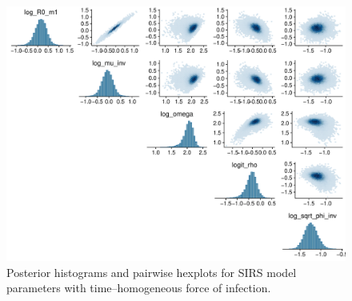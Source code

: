 \begin{figure}[htbp]
	\centering
	\includegraphics[width=\linewidth]{figures/sinfoi_const_pairs}
	\caption{Posterior histograms and pairwise hexplots for SIRS model parameters with time--homogeneous force of infection.}
	\label{fig:sinfoiconstpairs}
\end{figure}

